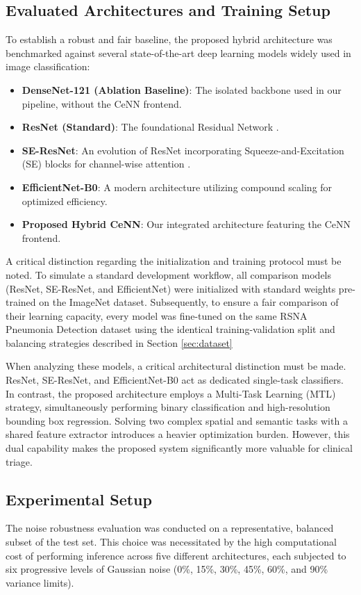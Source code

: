 \documentclass[a4paper,fleqn]{cas-dc}
\begin{document}
\subsection{Evaluated Architectures and Training Setup}
To establish a robust and fair baseline, the proposed hybrid architecture was benchmarked against several state-of-the-art deep learning models widely used in image classification:
\begin{itemize}
	\item \textbf{DenseNet-121 (Ablation Baseline)}: The isolated backbone used in our pipeline, without the CeNN frontend.
	\item \textbf{ResNet (Standard)}: The foundational Residual Network \cite{he2016deep}.
	\item \textbf{SE-ResNet}: An evolution of ResNet incorporating Squeeze-and-Excitation (SE) blocks for channel-wise attention \cite{hu2018squeeze}.
	\item \textbf{EfficientNet-B0}: A modern architecture \cite{tan2019efficientnet} utilizing compound scaling for optimized efficiency.
	\item \textbf{Proposed Hybrid CeNN}: Our integrated architecture featuring the CeNN frontend.
\end{itemize}

A critical distinction regarding the initialization and training protocol must be noted. To simulate a standard development workflow, all comparison models (ResNet, SE-ResNet, and EfficientNet) were initialized with standard weights pre-trained on the ImageNet dataset. Subsequently, to ensure a fair comparison of their learning capacity, every model was fine-tuned on the same RSNA Pneumonia Detection dataset using the identical training-validation split and balancing strategies described in Section \ref{sec:dataset}

When analyzing these models, a critical architectural distinction must be made. ResNet, SE-ResNet, and EfficientNet-B0 act as dedicated single-task classifiers. In contrast, the proposed architecture employs a Multi-Task Learning (MTL) strategy, simultaneously performing binary classification and high-resolution bounding box regression. Solving two complex spatial and semantic tasks with a shared feature extractor introduces a heavier optimization burden. However, this dual capability makes the proposed system significantly more valuable for clinical triage.

\subsection{Experimental Setup}
The noise robustness evaluation was conducted on a representative, balanced subset of the test set. This choice was necessitated by the high computational cost of performing inference across five different architectures, each subjected to six progressive levels of Gaussian noise (0\%, 15\%, 30\%, 45\%, 60\%, and 90\% variance limits). 
\end{document}
